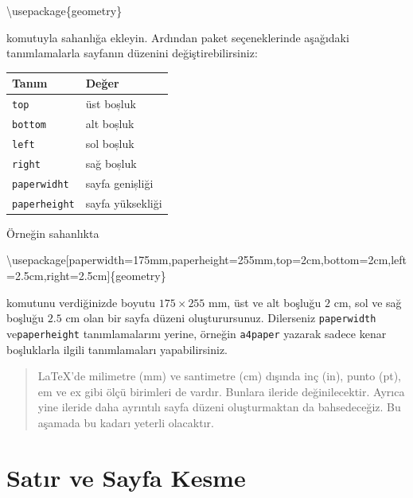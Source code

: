 \documentclass[
  10pt,
]{scrbook}
\newenvironment{Shaded}{\begin{snugshade}}{\end{snugshade}}
\newcommand{\BuiltInTok}[1]{#1}
\newcommand{\ExtensionTok}[1]{#1}
\newcommand{\NormalTok}[1]{#1}
\theoremstyle{definition}
\theoremstyle{definition}
\theoremstyle{definition}
\theoremstyle{definition}
\theoremstyle{remark}
\begin{document}
\begin{Shaded}
\begin{Highlighting}[]
\BuiltInTok{\textbackslash{}usepackage}\NormalTok{\{}\ExtensionTok{geometry}\NormalTok{\}}
\end{Highlighting}
\end{Shaded}

komutuyla sahanlığa ekleyin. Ardından paket seçeneklerinde aşağıdaki tanımlamalarla sayfanın düzenini değiştirebilirsiniz:

\begin{longtable}[]{@{}ll@{}}
\toprule
Tanım & Değer \\
\midrule
\endhead
\texttt{top} & üst boșluk \\
\texttt{bottom} & alt boșluk \\
\texttt{left} & sol boșluk \\
\texttt{right} & sağ boșluk \\
\texttt{paperwidht} & sayfa genișliği \\
\texttt{paperheight} & sayfa yüksekliği \\
\bottomrule
\end{longtable}

Örneğin sahanlıkta

\begin{Shaded}
\begin{Highlighting}[]
\BuiltInTok{\textbackslash{}usepackage}\NormalTok{[paperwidth=175mm,paperheight=255mm,top=2cm,bottom=2cm,left=2.5cm,right=2.5cm]\{}\ExtensionTok{geometry}\NormalTok{\}}
\end{Highlighting}
\end{Shaded}

komutunu verdiğinizde boyutu \(175\times 255\) mm, üst ve alt boşluğu \(2\) cm, sol ve sağ boşluğu \(2.5\) cm olan bir sayfa düzeni oluşturursunuz. Dilerseniz \texttt{paperwidth} ve\texttt{paperheight} tanımlamalarını yerine, örneğin \texttt{a4paper} yazarak sadece kenar boşluklarla ilgili tanımlamaları yapabilirsiniz.

\begin{quote}
LaTeX'de milimetre (mm) ve santimetre (cm) dışında inç (in), punto (pt), em ve ex gibi ölçü birimleri de vardır. Bunlara ileride değinilecektir. Ayrıca yine ileride daha ayrıntılı sayfa düzeni oluşturmaktan da bahsedeceğiz. Bu aşamada bu kadarı yeterli olacaktır.
\end{quote}

\hypertarget{satux131r-ve-sayfa-kesme}{%
\section{Satır ve Sayfa Kesme}\label{satux131r-ve-sayfa-kesme}}
\end{document}
